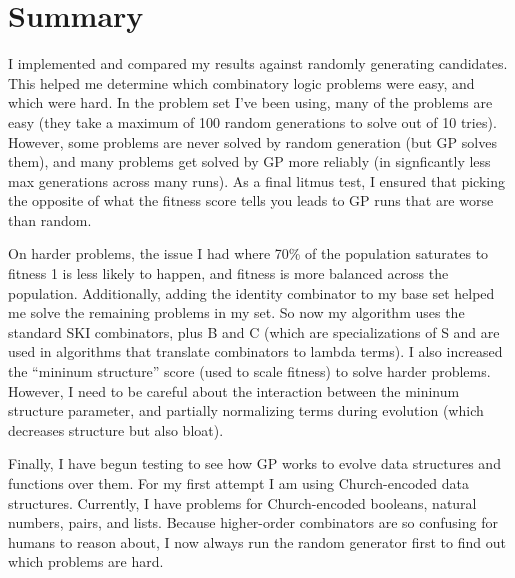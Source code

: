 \documentclass{article}
\begin{document}
\maketitle

\section{Summary}

I implemented and compared my results against randomly generating
candidates. This helped me determine which combinatory logic problems
were easy, and which were hard. In the problem set I've been using,
many of the problems are easy (they take a maximum of 100 random
generations to solve out of 10 tries). However, some problems are
never solved by random generation (but GP solves them), and many
problems get solved by GP more reliably (in signficantly less max
generations across many runs). As a final litmus test, I ensured that
picking the opposite of what the fitness score tells you leads to GP
runs that are worse than random.

On harder problems, the issue I had where 70\% of the population
saturates to fitness 1 is less likely to happen, and fitness is more balanced across the
population. Additionally, adding the identity combinator to my base
set helped me solve the remaining problems in my set. So now my
algorithm uses the standard SKI combinators, plus B and C (which are
specializations of S and are used in algorithms that translate
combinators to lambda terms). I also increased the
``mininum structure'' score (used to scale fitness) to solve harder
problems. However, I need to be careful about the interaction between the
mininum structure parameter, and partially normalizing terms during
evolution (which decreases structure but also bloat).

Finally, I have begun testing to see how GP works to evolve
data structures and functions over them. For my first attempt I am
using Church-encoded data structures. Currently, I have problems for
Church-encoded booleans, natural numbers, pairs, and lists.
Because higher-order combinators are so confusing for humans to
reason about, I now always run the random generator first to find out
which problems are hard. 
\end{document}
